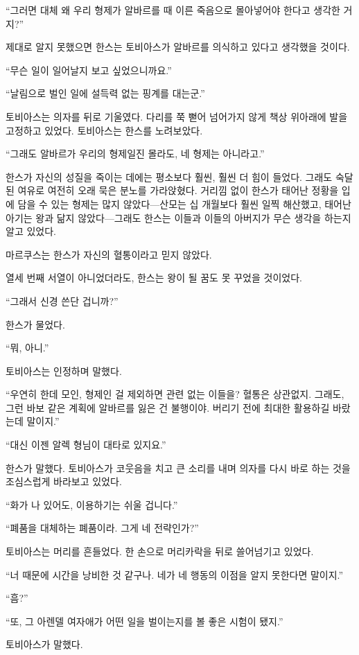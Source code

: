 ``그러면 대체 왜 우리 형제가 알바르를 때 이른 죽음으로 몰아넣어야 한다고 생각한 거지?''

제대로 알지 못했으면 한스는 토비아스가 알바르를 의식하고 있다고 생각했을 것이다.

``무슨 일이 일어날지 보고 싶었으니까요.''

``날림으로 벌인 일에 설득력 없는 핑계를 대는군.''

토비아스는 의자를 뒤로 기울였다. 다리를 쭉 뻗어 넘어가지 않게 책상 위아래에 발을 고정하고 있었다. 토비아스는 한스를 노려보았다.

``그래도 알바르가 우리의 형제일진 몰라도, 네 형제는 아니라고.''

한스가 자신의 성질을 죽이는 데에는 평소보다 훨씬, 훨씬 더 힘이 들었다. 그래도 숙달된 여유로 여전히 오래 묵은 분노를 가라앉혔다. 거리낌 없이 한스가 태어난 정황을 입에 담을 수 있는 형제는 많지 않았다—산모는 십 개월보다 훨씬 일찍 해산했고, 태어난 아기는 왕과 닮지 않았다—그래도 한스는 이들과 이들의 아버지가 무슨 생각을 하는지 알고 있었다.

마르쿠스는 한스가 자신의 혈통이라고 믿지 않았다.

열세 번째 서열이 아니었더라도, 한스는 왕이 될 꿈도 못 꾸었을 것이었다.

``그래서 신경 쓴단 겁니까?''

한스가 물었다.

``뭐, 아니.''

토비아스는 인정하며 말했다.

``우연히 한데 모인, 형제인 걸 제외하면 관련 없는 이들을? 혈통은 상관없지. 그래도, 그런 바보 같은 계획에 알바르를 잃은 건 불행이야. 버리기 전에 최대한 활용하길 바랐는데 말이지.''

``대신 이젠 알렉 형님이 대타로 있지요.''

한스가 말했다. 토비아스가 코웃음을 치고 큰 소리를 내며 의자를 다시 바로 하는 것을 조심스럽게 바라보고 있었다.

``화가 나 있어도, 이용하기는 쉬울 겁니다.''

``폐품을 대체하는 폐품이라. 그게 네 전략인가?''

토비아스는 머리를 흔들었다. 한 손으로 머리카락을 뒤로 쓸어넘기고 있었다.

``너 때문에 시간을 낭비한 것 같구나. 네가 네 행동의 이점을 알지 못한다면 말이지.''

``흠?''

``또, 그 아렌델 여자애가 어떤 일을 벌이는지를 볼 좋은 시험이 됐지.''

토비아스가 말했다.

